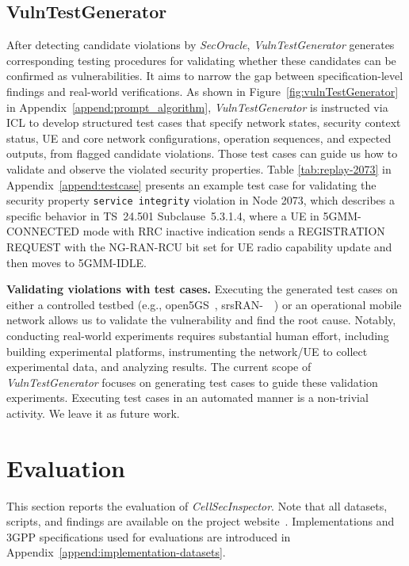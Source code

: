\documentclass[sigconf]{acmart}
\newcommand{\lm}{\textit{CellSecInspector}\xspace}
\begin{document}
{\subsection{VulnTestGenerator}

After detecting 
candidate violations by \textit{SecOracle}, \textit{VulnTestGenerator} generates corresponding testing procedures for validating whether these candidates can be confirmed as vulnerabilities.  
It aims to narrow the gap between specification-level findings and real-world verifications. As shown in Figure~\ref{fig:vulnTestGenerator} in Appendix~\ref{append:prompt_algorithm}, \textit{VulnTestGenerator} is instructed via ICL to develop structured test cases that specify network states, security context status, UE and core network configurations, operation sequences, and expected outputs, from flagged candidate violations. Those test cases can guide us how to validate and observe the violated security properties. 
Table \ref{tab:replay-2073} in Appendix~\ref{append:testcase} presents an example test case for validating the security property \texttt{service integrity} violation in Node 2073,  
which describes a specific behavior in TS~24.501 Subclause~5.3.1.4, where a UE in 5GMM-CONNECTED mode with RRC inactive indication sends a REGISTRATION REQUEST with the NG-RAN-RCU bit set for UE radio capability update and then moves to 5GMM-IDLE.


\noindent \textbf{Validating violations with test cases.} Executing the generated test cases on either a controlled testbed (e.g., open5GS~\cite{open5gs}, srsRAN-\ ~\cite{srsran}) or an operational mobile network allows us to validate the vulnerability and find the root cause. Notably, conducting real-world experiments requires substantial human effort, including building experimental platforms, instrumenting the network/UE to collect experimental data, and analyzing results. The current scope of \textit{VulnTestGenerator} focuses on generating test cases to guide these validation experiments. Executing test cases in an automated manner is a non-trivial activity. We leave it as future work.     






\section{Evaluation}

\noindent This section reports the evaluation of \lm. Note that all datasets, scripts, and findings are available on the project website~\cite{cellsecinspector2025}. Implementations and 3GPP specifications used for evaluations are introduced in Appendix~\ref{append:implementation-datasets}. 

}
\end{document}
